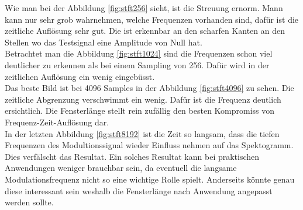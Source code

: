Wie man bei der Abbildung \ref{fig:stft256} sieht, ist die Streuung ernorm. Mann kann nur sehr grob wahrnehmen, welche Frequenzen vorhanden sind, dafür ist die zeitliche Auflösung sehr gut. Die ist erkennbar an den scharfen Kanten an den Stellen wo das Testsignal eine Amplitude von Null hat. \\

Betrachtet man die Abbildung \ref{fig:stft1024} sind die Frequenzen schon viel deutlicher zu erkennen als bei einem Sampling von 256. Dafür wird in der zeitlichen Auflösung ein wenig eingebüsst.\\

Das beste Bild ist bei 4096 Samples in der Abbildung \ref{fig:stft4096} zu sehen. Die zeitliche Abgrenzung verschwimmt ein wenig. Dafür ist die Frequenz deutlich ersichtlich. Die Fensterlänge stellt rein zufällig den besten Kompromiss von Frequenz-Zeit-Auflösung dar.\\

In der letzten Abbildung \ref{fig:stft8192} ist die Zeit so langsam, dass die tiefen Frequenzen des Modultionssignal wieder Einfluss nehmen auf das Spektogramm. Dies verfälscht das Resultat. Ein solches Resultat kann bei praktischen Anwendungen weniger brauchbar sein, da eventuell die  langsame Modulationsfrequenz nicht so eine wichtige Rolle spielt. Anderseits könnte genau diese interessant sein weshalb die Fensterlänge nach Anwendung angepasst werden sollte.\\
\newpage





